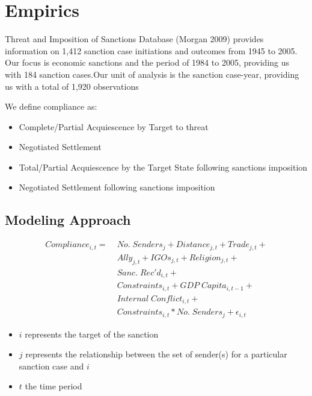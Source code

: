 \section{Empirics}
\label{empirics}

Threat and Imposition of Sanctions Database (Morgan 2009) provides information on 1,412 sanction case initiations and outcomes from 1945 to 2005.  Our focus is economic sanctions and the period of 1984 to 2005, providing us with 184 sanction cases.Our unit of analysis is the sanction case-year, providing us with a total of 1,920 observations
	
	
We define compliance as:
	\begin{itemize}
		\item Complete/Partial Acquiescence by Target to threat
		\item Negotiated Settlement
		\item Total/Partial Acquiescence by the Target State following sanctions imposition
		\item Negotiated Settlement following sanctions imposition
	\end{itemize}
	
\subsection{Modeling Approach} 
\begin{align*}
		Compliance_{i,t} =\; & No. \; Senders_{j} + Distance_{j,t} + Trade_{j,t}  + \\
		 &Ally_{j,t} + IGOs_{j,t} + Religion_{j,t} +\\
 		 &Sanc. \; Rec'd_{i,t} + \\
		 &Constraints_{i,t} + GDP \; Capita_{i,t-1} +\\
		 & Internal \; Conflict_{i,t} +\\
		 &Constraints_{i,t}*No. \; Senders_{j} + \epsilon_{i,t}
	\end{align*}
	
\begin{itemize}
	\item $i$ represents the target of the sanction
	\item $j$ represents the relationship between the set of sender(s) for a particular sanction case and $i$
	\item $t$ the time period
\end{itemize}
